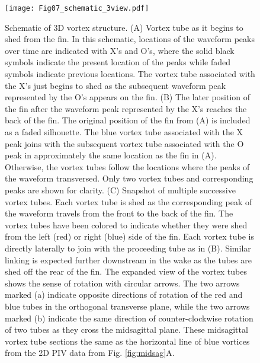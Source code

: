 \documentclass[onecolumn]{IEEEtran}
\begin{document}
\begin{figure}
\centering
\texttt{[image: Fig07\_schematic\_3view.pdf]}
\caption{ Schematic of 3D vortex structure.
(A) Vortex tube as it begins to shed from the fin. In this schematic,
locations of the waveform peaks over time are indicated with X's and O's,
where the solid black symbols indicate the present location of the peaks
while faded symbols indicate previous locations. The vortex tube
associated with the X's just begins to shed as the subsequent waveform
peak represented by the O's appears on the fin. 
(B) The later position of
the fin after the waveform peak represented by the X's reaches the back of
the fin. The original position of the fin from (A) is included as a faded
silhouette. The blue vortex tube associated with the X peak joins with the
subsequent vortex tube associated with the O peak in approximately the
same location as the fin in (A). Otherwise, the vortex tubes follow the
locations where the peaks of the waveform transversed. Only two vortex
tubes and corresponding peaks are shown for clarity.
(C) Snapshot of multiple successive vortex tubes. Each vortex tube is shed
as the corresponding peak of the waveform travels from the front to the
back of the fin. The vortex tubes have been colored to indicate whether
they were shed from the left (red) or right (blue) side of the fin. Each
vortex tube is directly laterally to join with the proceeding tube as in
(B). Similar linking is expected further downstream in the wake as the
tubes are shed off the rear of the fin. The expanded view of the vortex
tubes shows the sense of rotation with circular arrows. The two arrows
marked (a) indicate opposite directions of rotation of the red and blue
tubes in the orthogonal transverse plane, while the two arrows marked (b)
indicate the same direction of counter-clockwise rotation of two tubes as they cross the
midsagittal plane.  These midsagittal vortex tube sections the same 
as the horizontal line of blue vortices from the 2D PIV data from Fig. \ref{fig:midsag}A.
 }
\label{fig:schematic}
\end{figure}
\clearpage
\newpage
\end{document}
